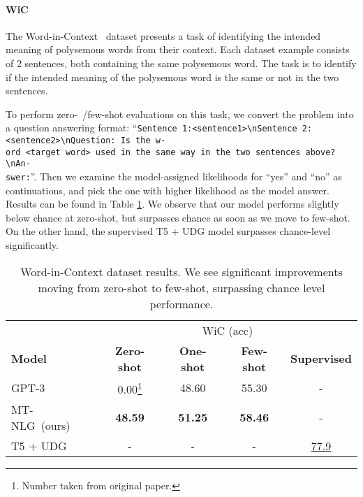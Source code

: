 \documentclass[11pt]{article}
\newcommand{\ours}{MT-NLG}
\begin{document}
\paragraph{WiC} The Word-in-Context~\citep{Pilehvar2019WiCTW} dataset presents a task of identifying the intended meaning of polysemous words from their context. Each dataset example consists of 2 sentences, both containing the same polysemous word. The task is to identify if the intended meaning of the polysemous word is the same or not in the two sentences.

To perform zero-~/few-shot evaluations on this task, we convert the problem into a question answering format: ``\texttt{Sentence 1:<sentence1>\textbackslash nSentence 2:<sentence2>\textbackslash nQuestion: Is the w-\\ord <target word> used in the same way in the two sentences above?\textbackslash nAn-\\swer:}''. Then we examine the model-assigned likelihoods for ``yes'' and ``no'' as continuations, and pick the one with higher likelihood as the model answer. Results can be found in Table \ref{tab:wic-perf}. We observe that our model performs slightly below chance at zero-shot, but surpasses chance as soon as we move to few-shot. On the other hand, the supervised T5 + UDG model surpasses chance-level significantly.



\begin{savenotes}
\begin{table}[t]
\centering
\small
\begin{tabular}{l c c c c}
 \toprule
 & \multicolumn{4}{c}{WiC (acc)} \\
 \cmidrule{2-5}
 \textbf{Model} &  \textbf{Zero-shot}  &  \textbf{One-shot} &  \textbf{Few-shot} & \textbf{Supervised} \\
 \midrule
 GPT-3  &   0.00\footnote{Number taken from original paper.}   &   48.60   &   55.30 & -  \\
 \ours~(ours)	&	\textbf{48.59}	&	\textbf{51.25}	&	\textbf{58.46} & -	\\
 \cmidrule{1-5}
 T5 + UDG & - & - & - & \underline{77.9} \\
 \bottomrule
\end{tabular}
\caption{Word-in-Context dataset results. We see significant improvements moving from zero-shot to few-shot, surpassing chance level performance.}
\label{tab:wic-perf}
\end{table}
\end{savenotes}
\end{document}
